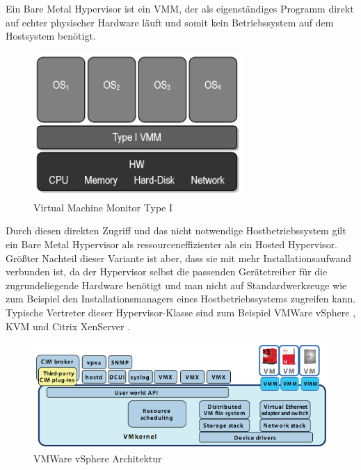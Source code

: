 
Ein Bare Metal Hypervisor ist ein \ac{VMM}, der als eigenständiges Programm direkt auf echter physischer Hardware läuft und somit kein Betriebssystem auf dem Hostsystem benötigt.

\begin{figure}[!ht]
  \begin{center}
    \includegraphics[width=8cm]{bilder/VMM-Type1.jpg}
    \caption{Virtual Machine Monitor Type I \citep{wiki:002}}
  \end{center}
\end{figure}

Durch diesen direkten Zugriff und das nicht notwendige Hostbetriebssystem gilt ein Bare Metal Hypervisor als ressourceneffizienter als ein Hosted Hypervisor. Größter Nachteil dieser Variante ist aber, dass sie mit mehr Installationsaufwand verbunden ist, da der Hypervisor selbst die passenden Gerätetreiber für die zugrundeliegende Hardware benötigt und man nicht auf Standardwerkzeuge wie zum Beispiel den Installationsmanagers eines Hostbetriebssystems zugreifen kann. Typische Vertreter dieser Hypervisor-Klasse sind zum Beispiel VMWare vSphere \citep[Vgl.][]{vmware:001}, KVM und Citrix XenServer \citep[Vgl.][]{xen:001}.

\begin{figure}[!ht]
  \begin{center}
    \includegraphics[width=14cm]{bilder/vmware.png}
    \caption{VMWare vSphere Architektur \citep{vmware:002}}
  \end{center}
\end{figure}

